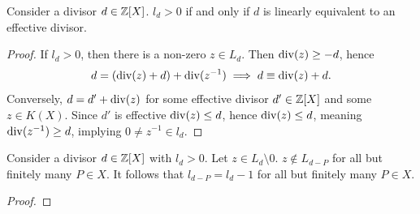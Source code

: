     \begin{lemma}\label{LVectorSpaceNonZeroImpliesLinEquivToEffectiveDivisor}
        Consider a divisor $d\in \mathbb{Z}[X]$. $l_d>0$ if and only if $d$ is linearly equivalent to an effective divisor. 
    \end{lemma}
    \begin{proof}
        If $l_d >0$, then there is a non-zero $z\in L_d$. Then $\mathrm{div}(z) \geq -d$, hence 
        $$
            d = (\mathrm{div}(z)+d)+\mathrm{div}(z^{-1}) \implies d \equiv \mathrm{div}(z)+d.
        $$
        Conversely,  $d = d' + \mathrm{div}(z)$ for some effective divisor $d'\in\mathbb{Z}[X]$ and some $z\in K(X)$. Since $d'$ is effective $\mathrm{div}(z)\leq d$, hence $\mathrm{div}(z)\leq d$, meaning $\mathrm{div}(z^{-1}) \geq d$, implying $0\neq z^{-1} \in l_d$.
    \end{proof}
    \begin{lemma}
        Consider a divisor $d\in \mathbb{Z}[X]$ with $l_d>0$. Let $z\in L_d\setminus 0$. $z\notin L_{d-P}$ for all but finitely many $P\in X$. It follows that $l_{d-P} = l_d-1$ for all but finitely many $P\in X$.
    \end{lemma}
    \begin{proof}
        
    \end{proof}
